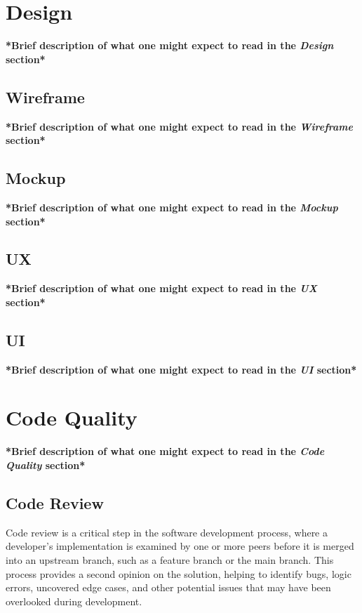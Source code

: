 \section{Design}

\textbf{*Brief description of what one might expect to read in the \textit{Design} section*}

\subsection{Wireframe}

\textbf{*Brief description of what one might expect to read in the \textit{Wireframe} section*}

\subsection{Mockup}

\textbf{*Brief description of what one might expect to read in the \textit{Mockup} section*}

\subsection{UX}

\textbf{*Brief description of what one might expect to read in the \textit{UX} section*}

\subsection{UI}

\textbf{*Brief description of what one might expect to read in the \textit{UI} section*}

\section{Code Quality}

\textbf{*Brief description of what one might expect to read in the \textit{Code Quality} section*}

\subsection{Code Review}

Code review is a critical step in the software development process, where a developer's implementation is examined by one or more peers before it is merged into an upstream branch, such as a feature branch or the main branch. This process provides a second opinion on the solution, helping to identify bugs, logic errors, uncovered edge cases, and other potential issues that may have been overlooked during development. \cite{gitlab:code-review} \\

